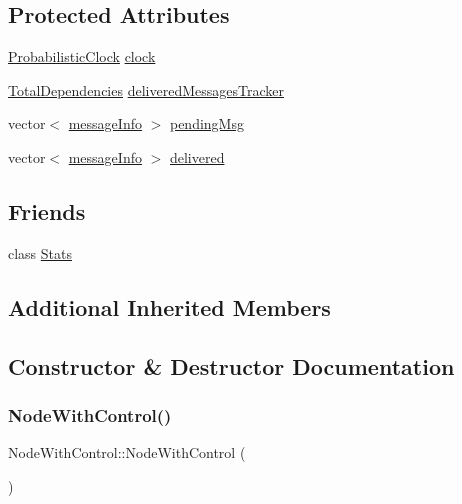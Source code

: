 \subsection*{Protected Attributes}
\begin{DoxyCompactItemize}
\item 
\hyperlink{class_probabilistic_clock}{Probabilistic\+Clock} \hyperlink{class_node_with_control_a051a7d7f2452f1f8da3bc5bfb05a7760}{clock}
\item 
\hyperlink{class_total_dependencies}{Total\+Dependencies} \hyperlink{class_node_with_control_a6c868fa52cca68f650dca96a788475df}{delivered\+Messages\+Tracker}
\item 
vector$<$ \hyperlink{structures_8h_a7e7bdc1d2fff8a9436f2f352b2711ed6}{message\+Info} $>$ \hyperlink{class_node_with_control_af38ffbedc82038536c77314f22ea6b57}{pending\+Msg}
\item 
vector$<$ \hyperlink{structures_8h_a7e7bdc1d2fff8a9436f2f352b2711ed6}{message\+Info} $>$ \hyperlink{class_node_with_control_aed34cc5a5b277c43f10f8cbbbeb59327}{delivered}
\end{DoxyCompactItemize}
\subsection*{Friends}
\begin{DoxyCompactItemize}
\item 
class \hyperlink{class_node_with_control_a129f65b6976377739eb6231b6962985e}{Stats}
\end{DoxyCompactItemize}
\subsection*{Additional Inherited Members}


\subsection{Constructor \& Destructor Documentation}
\mbox{\label{class_node_with_control_ab0a223aca65e289aaee682dadfbefb5c}} 
\subsubsection{\texorpdfstring{Node\+With\+Control()}{NodeWithControl()}}
{\footnotesize\ttfamily Node\+With\+Control\+::\+Node\+With\+Control (\begin{DoxyParamCaption}{ }\end{DoxyParamCaption})}

